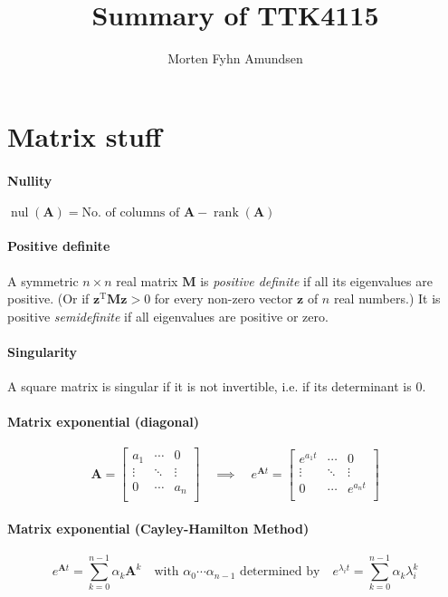 \documentclass[a4paper]{article}
\title{Summary of TTK4115}
\author{Morten Fyhn Amundsen}
\affil{NTNU}
\newcommand{\M}[1]{\bm{#1}}
\newcommand{\V}[1]{\mathbf{#1}}
\newcommand{\transpose}{^{\text{T}}}
\DeclareMathOperator{\nul}{nul}
\DeclareMathOperator{\rank}{rank}
\begin{document}
\maketitle



\section{Matrix stuff}
\paragraph{Nullity} $\nul(\M{A}) = \mbox{No. of columns of } \M{A} - \rank(\M{A})$
\paragraph{Positive definite} A symmetric $n \times n$ real matrix $\M{M}$ is \emph{positive definite} if all its eigenvalues are positive. (Or if $\V{z}\transpose \M{M}\V{z} > 0$ for every non-zero vector $\V{z}$ of $n$ real numbers.) It is positive \emph{semidefinite} if all eigenvalues are positive or zero.
\paragraph{Singularity} A square matrix is singular if it is not invertible, i.e. if its determinant is $0$.
\paragraph{Matrix exponential (diagonal)}
$$\M{A} =
\begin{bmatrix}
a_1		& \cdots	& 0			\\
\vdots 	& \ddots	& \vdots	\\
0		& \cdots	& a_n		\\
\end{bmatrix}
\quad \implies \quad
e^{\M{A}t} =
\begin{bmatrix}
e^{a_1t}	& \cdots	& 0			\\
\vdots 		& \ddots	& \vdots	\\
0			& \cdots	& e^{a_nt}	\\
\end{bmatrix}$$
\paragraph{Matrix exponential (Cayley-Hamilton Method)}
$$e^{\M{A}t} = \sum_{k=0}^{n-1} \alpha_k \M{A}^k
\quad \text {with } \alpha_0 \cdots \alpha_{n-1} \text{ determined by} \quad
e^{\lambda_i t} = \sum_{k=0}^{n-1} \alpha_k \lambda_i^k$$
\end{document}
